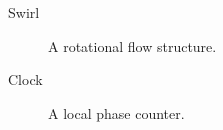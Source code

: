 \documentclass{article}
\begin{document}
\begin{description}
\item[Swirl] A rotational flow structure.
\item[Clock] A local phase counter.
\end{description}
\end{document}
